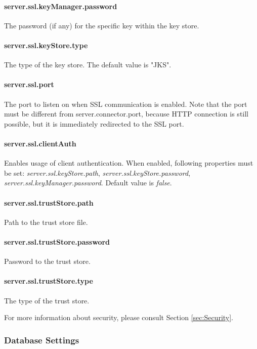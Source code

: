 \paragraph{server.ssl.keyManager.password}
The password (if any) for the specific key within the key store.

\paragraph{server.ssl.keyStore.type}
The type of the key store. The default value is "JKS".

\paragraph{server.ssl.port}
The port to listen on when SSL communication is enabled. Note that the port must
be different from server.connector.port, because HTTP connection is still possible,
but it is immediately redirected to the SSL port.

\paragraph{server.ssl.clientAuth}
Enables usage of client authentication. When enabled, following properties must
be set: \emph{server.ssl.keyStore.path}, \emph{server.ssl.keyStore.password},
\emph{server.ssl.keyManager.password}. Default value is \emph{false}.

\paragraph{server.ssl.trustStore.path}
Path to the trust store file.

\paragraph{server.ssl.trustStore.password}
Password to the trust store.

\paragraph{server.ssl.trustStore.type}
The type of the trust store.

\vspace{0.75cm}
For more information about security, please consult Section \ref{sec:Security}.

\subsubsection{Database Settings}
\label{sssec:DataSettings}

